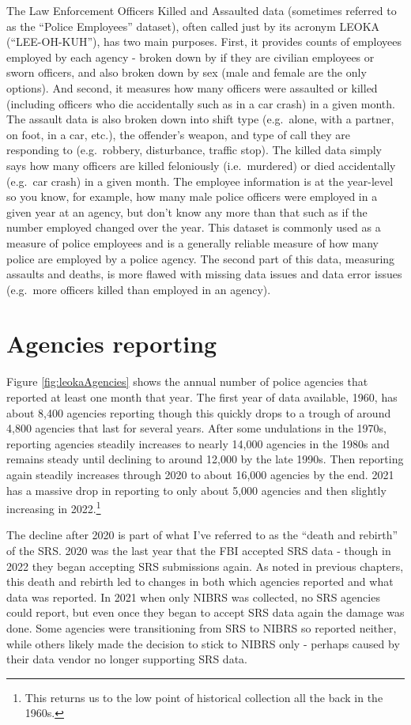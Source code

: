 \documentclass[
  12pt,
  openany]{book}
\begin{document}
The Law Enforcement Officers Killed and Assaulted data (sometimes referred to as the ``Police Employees'' dataset), often called just by its acronym LEOKA (``LEE-OH-KUH''), has two main purposes. First, it provides counts of employees employed by each agency - broken down by if they are civilian employees or sworn officers, and also broken down by sex (male and female are the only options). And second, it measures how many officers were assaulted or killed (including officers who die accidentally such as in a car crash) in a given month. The assault data is also broken down into shift type (e.g.~alone, with a partner, on foot, in a car, etc.), the offender's weapon, and type of call they are responding to (e.g.~robbery, disturbance, traffic stop). The killed data simply says how many officers are killed feloniously (i.e.~murdered) or died accidentally (e.g.~car crash) in a given month. The employee information is at the year-level so you know, for example, how many male police officers were employed in a given year at an agency, but don't know any more than that such as if the number employed changed over the year. This dataset is commonly used as a measure of police employees and is a generally reliable measure of how many police are employed by a police agency. The second part of this data, measuring assaults and deaths, is more flawed with missing data issues and data error issues (e.g.~more officers killed than employed in an agency).

\section{Agencies reporting}\label{agencies-reporting-3}

Figure \ref{fig:leokaAgencies} shows the annual number of police agencies that reported at least one month that year. The first year of data available, 1960, has about 8,400 agencies reporting though this quickly drops to a trough of around 4,800 agencies that last for several years. After some undulations in the 1970s, reporting agencies steadily increases to nearly 14,000 agencies in the 1980s and remains steady until declining to around 12,000 by the late 1990s. Then reporting again steadily increases through 2020 to about 16,000 agencies by the end. 2021 has a massive drop in reporting to only about 5,000 agencies and then slightly increasing in 2022.\footnote{This returns us to the low point of historical collection all the back in the 1960s.}

The decline after 2020 is part of what I've referred to as the ``death and rebirth'' of the SRS. 2020 was the last year that the FBI accepted SRS data - though in 2022 they began accepting SRS submissions again. As noted in previous chapters, this death and rebirth led to changes in both which agencies reported and what data was reported. In 2021 when only NIBRS was collected, no SRS agencies could report, but even once they began to accept SRS data again the damage was done. Some agencies were transitioning from SRS to NIBRS so reported neither, while others likely made the decision to stick to NIBRS only - perhaps caused by their data vendor no longer supporting SRS data.
\end{document}
